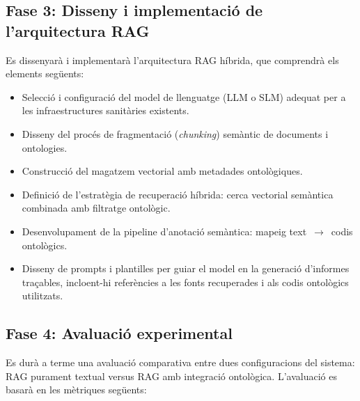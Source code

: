 \documentclass[CAT]{TFUOC}%
\begin{document}
\subsection*{Fase 3: Disseny i implementació de l'arquitectura RAG}
Es dissenyarà i implementarà l'arquitectura RAG híbrida, que comprendrà els elements següents:

\begin{itemize}
    \item Selecció i configuració del model de llenguatge (LLM o SLM) adequat per a les infraestructures sanitàries existents.
    \item Disseny del procés de fragmentació (\textit{chunking}) semàntic de documents i ontologies.
    \item Construcció del magatzem vectorial amb metadades ontològiques.
    \item Definició de l'estratègia de recuperació híbrida: cerca vectorial semàntica combinada amb filtratge ontològic.
    \item Desenvolupament de la pipeline d'anotació semàntica: mapeig text~$\to$~codis ontològics.
    \item Disseny de prompts i plantilles per guiar el model en la generació d'informes traçables, incloent-hi referències a les fonts recuperades i als codis ontològics utilitzats.
\end{itemize}

\subsection*{Fase 4: Avaluació experimental}

Es durà a terme una avaluació comparativa entre dues configuracions del sistema: RAG purament textual versus RAG amb integració ontològica. L'avaluació es basarà en les mètriques següents:
\end{document}

